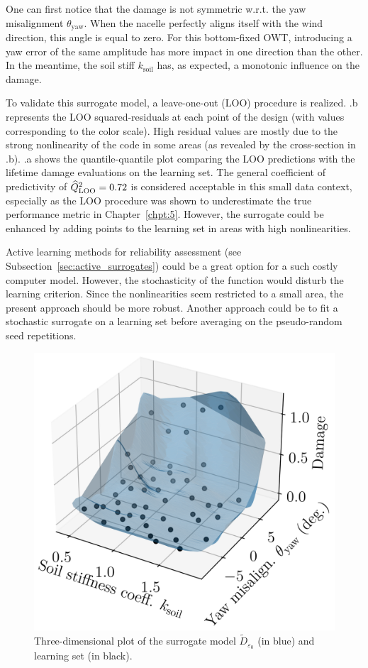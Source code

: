 One can first notice that the damage is not symmetric w.r.t. the yaw misalignment $\theta_{\mathrm{yaw}}$. 
When the nacelle perfectly aligns itself with the wind direction, this angle is equal to zero. 
For this bottom-fixed OWT, introducing a yaw error of the same amplitude has more impact in one direction than the other. 
In the meantime, the soil stiff $k_{\mathrm{soil}}$ has, as expected, a monotonic influence on the damage. 

To validate this surrogate model, a leave-one-out (LOO) procedure is realized. 
.b represents the LOO squared-residuals at each point of the design (with values corresponding to the color scale). 
High residual values are mostly due to the strong nonlinearity of the code in some areas (as revealed by the cross-section in .b).
.a shows the quantile-quantile plot comparing the LOO predictions with the lifetime damage evaluations on the learning set. 
The general coefficient of predictivity of $\widehat{Q}^2_{\mathrm{LOO}}=0.72$ is considered acceptable in this small data context, especially as the LOO procedure was shown to underestimate the true performance metric in Chapter~\ref{chpt:5}. 
However, the surrogate could be enhanced by adding points to the learning set in areas with high nonlinearities.

\medskip
\begin{remark}
    Active learning methods for reliability assessment (see Subsection~\ref{sec:active_surrogates}) could be a great option for a such costly computer model. 
    However, the stochasticity of the function would disturb the learning criterion. 
    Since the nonlinearities seem restricted to a small area, the present approach should be more robust. 
    Another approach could be to fit a stochastic surrogate \citep{binois_2019_replication,baker_2022_stochastic_surrogates_review,zhu_2023_thesis} on a learning set before averaging on the pseudo-random seed repetitions.  
\end{remark}
\medskip

\begin{figure}[h!]
    \centering
    \includegraphics[width=0.45\linewidth]{./part3/figures/OWT/3D_surrogate.png}
    \caption{Three-dimensional plot of the surrogate model $\widetilde{D}_{\varepsilon_0}$ (in blue) and learning set (in black).}
    \label{fig:3d_owt_surrogate}
\end{figure}


